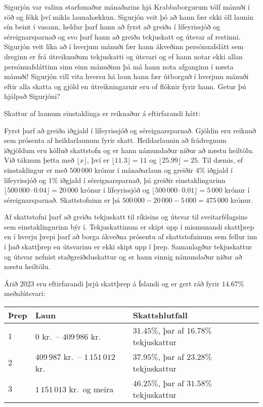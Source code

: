 
Sigurjón var valinn starfsmaður mánaðarins hjá Krabbaborgurum tólf mánuði í röð
og fékk því mikla launahækkun. Sigurjón veit þó að hann fær ekki öll launin sín
beint í vasann, heldur þarf hann að fyrst að greiða í lífeyrissjóð og
séreignarsparnað og svo þarf hann að greiða tekjuskatt og útsvar af restinni.
Sigurjón veit líka að í hverjum mánuði fær hann ákveðinn persónuafslátt sem
dreginn er frá útreiknuðum tekjuskatti og útsvari og ef hann notar ekki allan
persónuafsláttinn sinn einn mánuðinn þá má hann nota afganginn í næsta mánuði!
Sigurjón vill vita hversu há laun hann fær útborguð í hverjum mánuði eftir alla
skatta og gjöld en útreikningarnir eru of flóknir fyrir hann. Getur þú hjálpað
Sigurjóni?

Skattur af launum einstaklinga er reiknaður á eftirfarandi hátt:

Fyrst þarf að greiða iðgjald í lífeyrissjóð og séreignarsparnað. Gjöldin eru
reiknuð sem prósenta af heildarlaunum fyrir skatt. Heildarlaunin að frádregnum
iðgjöldum eru kölluð skattstofn og er hann námundaður niður að næstu heiltölu.
Við táknum þetta með $\lfloor x \rfloor$, því er
$\lfloor 11.3 \rfloor = 11$ og $\lfloor 25.99 \rfloor = 25$.
Til dæmis, ef einstaklingur er með $500\,000$ krónur í mánaðarlaun og greiðir
$4\%$ iðgjald í lífeyrissjóð og $1\%$ iðgjald í séreignarsparnað, þá greiðir
einstaklingurinn $\lfloor 500\,000 \cdot 0.04 \rfloor= 20\,000$ krónur í
lífeyrissjóð og $\lfloor 500\,000 \cdot 0.01 \rfloor = 5\,000$ krónur í
séreignarsparnað. Skattstofninn er þá
$500\,000 - 20\,000 - 5\,000 = 475\,000$ krónur.

Af skattstofni þarf að greiða tekjuskatt til ríkisins og útsvar til
sveitarfélagsins sem einstaklingurinn býr í. Tekjuskattinum er skipt upp í
mismunandi skattþrep en í hverju þrepi þarf að borga ákveðna prósentu af
skattstofninum sem fellur inn í það skattþrep en útsvarinu er ekki skipt upp í
þrep. Samanlagður tekjuskattur og útsvar nefnist staðgreiðsluskattur og er hann
einnig námundaður niður að næstu heiltölu.

Árið 2023 eru eftirfarandi þrjú skattþrep á Íslandi og er gert ráð fyrir $14.67\%$
meðalútsvari:

\begin{table}[h]
\begin{tabular}{lll}
    Þrep & Laun & Skattshlutfall \\ \hline
    $1$ & $0$ kr.\ -- $409\,986$ kr. & $31.45\%$, þar af $16.78\%$ tekjuskattur \\
    $2$ & $409\,987$ kr.\ -- $1\,151\,012$ kr. & $37.95\%$, þar af $23.28\%$ tekjuskattur \\
    $3$ & $1\,151\,013$ kr.\ og meira & $46.25\%$, þar af $31.58\%$ tekjuskattur \\
\end{tabular}
\end{table}

